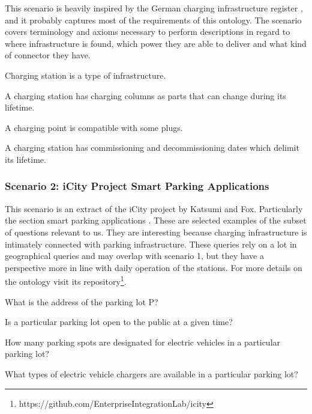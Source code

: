 This scenario is heavily inspired by the German charging infrastructure
register \cite{Bundesnetzagentur.27Oct2023}, and it probably captures most of
the requirements of this ontology. The scenario covers terminology and axioms
necessary to perform descriptions in regard to where infrastructure is found,
which power they are able to deliver and what kind of connector they have.

\begin{namedbreak}
    Charging station is a type of infrastructure.
\end{namedbreak}

\begin{namedbreak}
    A charging station has charging columns as parts that can change during its lifetime.
\end{namedbreak}
\begin{namedbreak}
    A charging point is compatible with some plugs.
\end{namedbreak}

\begin{namedbreak}
    A charging station has commissioning and decommissioning dates which delimit its lifetime.
\end{namedbreak}

\subsubsection*{Scenario 2: iCity Project Smart Parking Applications}

This scenario is an extract of the iCity project by Katsumi and Fox.
Particularly the section smart parking applications \cite{Katsumi.2020}. These
are selected examples of the subset of questions relevant to us. They are
interesting because charging infrastructure is intimately connected with
parking infrastructure. These queries rely on a lot in geographical queries and
may overlap with scenario 1, but they have a perspective more in line with
daily operation of the stations. For more details on the ontology visit its
repository\footnote{https://github.com/EnterpriseIntegrationLab/icity}.


\begin{namedbreak}
    What is the address of the parking lot P?
\end{namedbreak}

\begin{namedbreak}
    Is a particular parking lot open to the public at a given time?
\end{namedbreak}

\begin{namedbreak}
    How many parking spots are designated for electric vehicles in a particular parking lot?
\end{namedbreak}

\begin{namedbreak}
    What types of electric vehicle chargers are available in a particular parking lot?
\end{namedbreak}